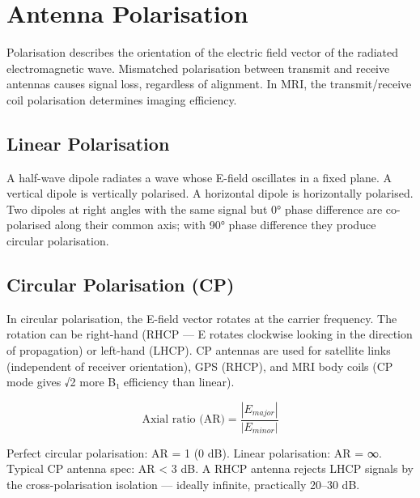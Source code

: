 \section{Antenna Polarisation}\label{sec:wiki_polarisation}



Polarisation describes the orientation of the electric field vector of the radiated electromagnetic wave. Mismatched polarisation between transmit and receive antennas causes signal loss, regardless of alignment. In MRI, the transmit/receive coil polarisation determines imaging efficiency.

      

\subsection{Linear Polarisation}

      

A half-wave dipole radiates a wave whose E-field oscillates in a fixed plane. A vertical dipole is vertically polarised. A horizontal dipole is horizontally polarised. Two dipoles at right angles with the same signal but 0° phase difference are co-polarised along their common axis; with 90° phase difference they produce circular polarisation.

      

\subsection{Circular Polarisation (CP)}

      

In circular polarisation, the E-field vector rotates at the carrier frequency. The rotation can be right-hand (RHCP — E rotates clockwise looking in the direction of propagation) or left-hand (LHCP). CP antennas are used for satellite links (independent of receiver orientation), GPS (RHCP), and MRI body coils (CP mode gives √2 more B₁ efficiency than linear).


      
\[\text{Axial ratio (AR)} = \dfrac{|E_{major}|}{|E_{minor}|}\]

      

Perfect circular polarisation: AR = 1 (0 dB). Linear polarisation: AR = ∞. Typical CP antenna spec: AR \textless{} 3 dB. A RHCP antenna rejects LHCP signals by the cross-polarisation isolation — ideally infinite, practically 20–30 dB.

